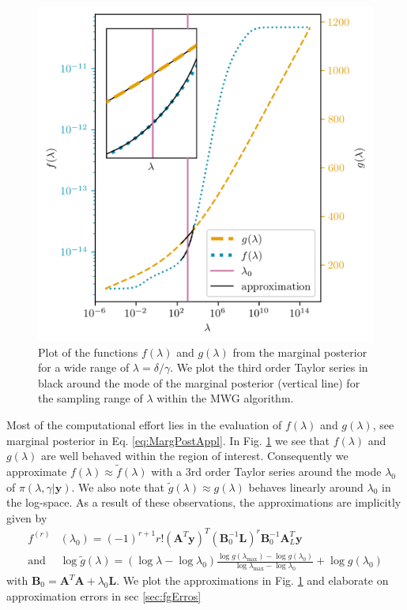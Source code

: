 \begin{figure}[ht!]
	\centering
	\includegraphics{f_and_g_phd.png}
	\caption[Plot of the functions $f(\lambda)$ and $g(\lambda)$ for marginal posterior.]{Plot of the functions $f(\lambda)$ and $g(\lambda)$ from the marginal posterior for a wide range of $\lambda = \delta / \gamma$. We plot the third order Taylor series in black around the mode of the marginal posterior (vertical line) for the sampling range of $\lambda$ within the MWG algorithm.}
	\label{fig:fandg}
\end{figure}
Most of the computational effort lies in the evaluation of $f(\lambda)$ and $g(\lambda)$, see marginal posterior in Eq. \ref{eq:MargPostAppl}.
In  Fig. \ref{fig:fandg} we see that $f(\lambda)$ and $g(\lambda)$ are well behaved within the region of interest.
Consequently we approximate $f(\lambda) \approx \tilde{f}(\lambda)$ with a 3rd order Taylor series around the mode $\lambda_0$ of $\pi(\lambda, \gamma | \bm{y})$.
We also note that $\tilde{g}(\lambda) \approx g(\lambda)$ behaves linearly around $\lambda_0$ in the log-space.
As a result of these observations, the approximations are implicitly given by
\begin{align}
	f^{(r)}& (\lambda_0)= (-1)^{r+1} r! (\bm{A}^T \bm{y})^T (\bm{B}_0^{-1} \bm{L})^r \bm{B}_0^{-1} \bm{A}_L^T \bm{y} \label{eq:ftay}  \\
	\text{and } & \log{ \tilde{g}(\lambda)} = (\log{\lambda} - \log{\lambda_{0}})  \frac{ \log{g(\lambda_{\text{max}})} - \log{g(\lambda_{0})} }{\log{\lambda_{\text{max}}} - \log{\lambda_{0}} } + \log{ g(\lambda_{0})} 
	\label{eq:gtay}
\end{align} 
with $\bm{B}_0 = \bm{A}^T  \bm{A} + \lambda_0 \bm{L}$.
We plot the approximations in Fig. \ref{fig:fandg} and elaborate on approximation errors in sec \ref{sec:fgErros}






